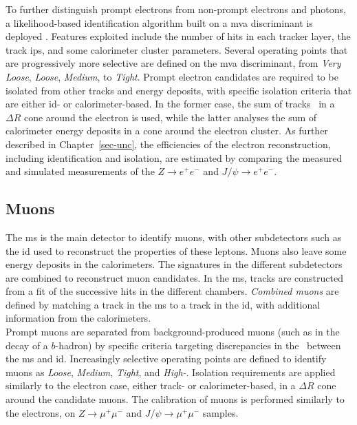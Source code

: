To further distinguish prompt electrons from non-prompt electrons and photons, a likelihood-based identification algorithm built on a \gls{mva} discriminant is deployed \cite{Aaboud:2657964}. Features exploited include the number of hits in each tracker layer, the track \glspl{ip}, and some calorimeter cluster parameters. Several operating points that are progressively more selective are defined on the \gls{mva} discriminant, from \textit{Very Loose}, \textit{Loose}, \textit{Medium}, to \textit{Tight}. Prompt electron candidates are required to be isolated from other tracks and energy deposits, with specific isolation criteria that are either \gls{id}- or calorimeter-based. In the former case, the sum of tracks \pt\ in a $\Delta R$ cone around the electron is used, while the latter analyses the sum of calorimeter energy deposits in a cone around the electron cluster. As further described in Chapter~\ref{sec-unc}, the efficiencies of the electron reconstruction, including identification and isolation, are estimated by comparing the measured and simulated measurements of the $Z\rightarrow e^+e^-$ and $J/\psi\rightarrow e^+e^-$. 

\subsection{Muons}\label{sec-atlas-mu}
The \gls{ms} is the main detector to identify muons, with other subdetectors such as the \gls{id} used to reconstruct the properties of these leptons. Muons also leave some energy deposits in the calorimeters. The signatures in the different subdetectors are combined to reconstruct muon candidates. In the \gls{ms}, tracks are constructed from a fit of the successive hits in the different chambers. \textit{Combined muons} are defined by matching a track in the \gls{ms} to a track in the \gls{id}, with additional information from the calorimeters. \\

Prompt muons are separated from background-produced muons (such as in the decay of a $b$-hadron) by specific criteria targeting discrepancies in the \pt\ between the \gls{ms} and \gls{id}. Increasingly selective operating points are defined to identify muons as \textit{Loose}, \textit{Medium}, \textit{Tight}, and \textit{High-\pt}. Isolation requirements are applied similarly to the electron case, either track- or calorimeter-based, in a $\Delta R$ cone around the candidate muons. The calibration of muons is performed similarly to the electrons, on $Z\rightarrow \mu^+\mu^-$ and $J/\psi\rightarrow \mu^+\mu^-$ samples.

